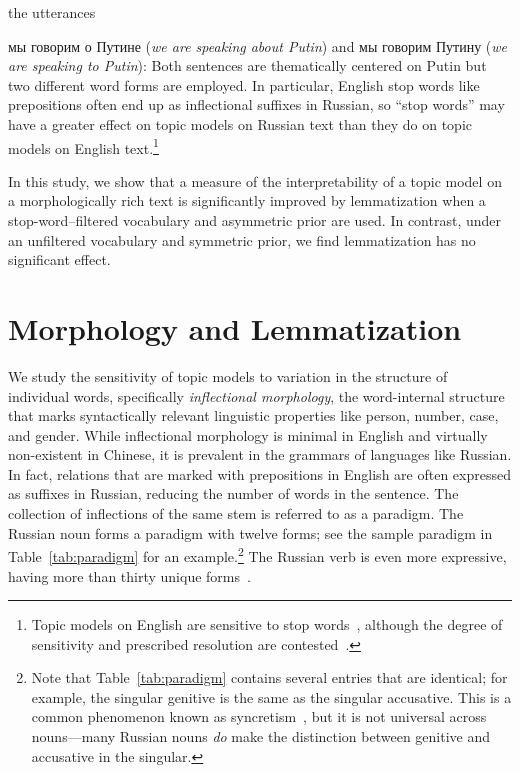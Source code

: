 \documentclass[11pt,letterpaper]{article}
\begin{document}
the utterances {{мы говорим о Путине} ({\em we
are speaking about Putin}) and {{мы
  говорим Путину} ({\em we are speaking to Putin})}: Both sentences
are thematically centered on Putin but two different word forms
are employed.  In particular,
English stop words like prepositions often end up as inflectional
suffixes in Russian, so ``stop words'' may have a greater effect on
topic models on Russian text than they do on topic models on English
text.\footnote{
	Topic models on English are sensitive to stop
	words~\cite{wallach2009,blei2010,eisenstein2011},
	although the degree of sensitivity and prescribed
    resolution are contested~\cite{schofield2017}.
}

In this study, we show that a measure of the interpretability of a
topic model on a morphologically rich text is significantly
improved by lemmatization when a stop-word--filtered vocabulary and
asymmetric prior are used.  In contrast, under an unfiltered vocabulary
and symmetric prior, we find lemmatization has no significant effect.


\section{Morphology and Lemmatization}\label{sec:inflectional}

We study the sensitivity of topic models to variation in the structure
of individual words, specifically
{\em inflectional morphology}, the word-internal
structure that marks syntactically relevant linguistic
properties like person, number, case, and gender.
While inflectional morphology is minimal in English and
virtually non-existent in Chinese, it is prevalent in
the grammars of languages like Russian. In fact, relations that are marked with prepositions in English are often expressed as suffixes in Russian, reducing the number of words in the
sentence. The collection of inflections of the same stem is referred to as a
paradigm.  The Russian noun forms a paradigm with twelve
forms; see the sample paradigm in Table~\ref{tab:paradigm} for an
example.\footnote{
  Note that Table~\ref{tab:paradigm} contains several
  entries that are identical; for example, the singular genitive is the same
  as the singular accusative. This is a common phenomenon known as
  syncretism~\cite{baerman2005syntax}, but it is not universal across
  nouns---many Russian nouns {\em do} make the distinction between
  genitive and accusative in the singular.
}
The Russian verb is even more expressive, having more
than thirty unique forms~\cite{wade2010comprehensive}.

}
\end{document}
